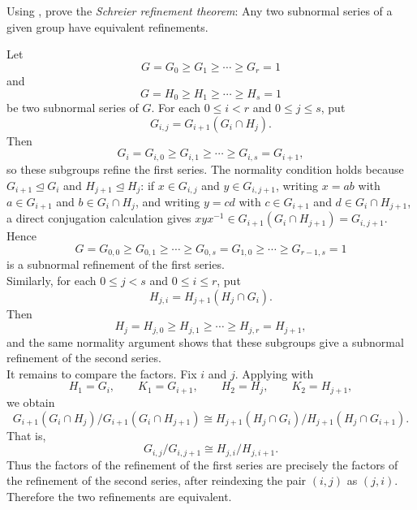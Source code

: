\documentclass[../Odyssey_Project.tex]{subfiles}
\begin{document}
\begin{exercise}
\label{ex:10.3}
Using , prove the \emph{Schreier refinement theorem}: Any two subnormal series of a given group have equivalent refinements.
\end{exercise}
\begin{solution}
Let
\[
  G=G_0\geq G_1\geq\cdots\geq G_r=1
\]
and
\[
  G=H_0\geq H_1\geq\cdots\geq H_s=1
\]
be two subnormal series of $G$. For each $0\leq i<r$ and $0\leq j\leq s$, put
\[
  G_{i,j}=G_{i+1}(G_i\cap H_j).
\]
Then
\[
  G_i=G_{i,0}\geq G_{i,1}\geq\cdots\geq G_{i,s}=G_{i+1},
\]
so these subgroups refine the first series. The normality condition holds because $G_{i+1}\trianglelefteq G_i$ and $H_{j+1}\trianglelefteq H_j$: if $x\in G_{i,j}$ and $y\in G_{i,j+1}$, writing $x=ab$ with $a\in G_{i+1}$ and $b\in G_i\cap H_j$, and writing $y=cd$ with $c\in G_{i+1}$ and $d\in G_i\cap H_{j+1}$, a direct conjugation calculation gives $xyx^{-1}\in G_{i+1}(G_i\cap H_{j+1})=G_{i,j+1}$. Hence
\[
  G=G_{0,0}\geq G_{0,1}\geq\cdots\geq G_{0,s}
  =G_{1,0}\geq\cdots\geq G_{r-1,s}=1
\]
is a subnormal refinement of the first series.\\
Similarly, for each $0\leq j<s$ and $0\leq i\leq r$, put
\[
  H_{j,i}=H_{j+1}(H_j\cap G_i).
\]
Then
\[
  H_j=H_{j,0}\geq H_{j,1}\geq\cdots\geq H_{j,r}=H_{j+1},
\]
and the same normality argument shows that these subgroups give a subnormal refinement of the second series.\\
It remains to compare the factors. Fix $i$ and $j$. Applying  with
\[
  H_1=G_i,\qquad K_1=G_{i+1},\qquad H_2=H_j,\qquad K_2=H_{j+1},
\]
we obtain
\[
  G_{i+1}(G_i\cap H_j)/G_{i+1}(G_i\cap H_{j+1})
  \cong
  H_{j+1}(H_j\cap G_i)/H_{j+1}(H_j\cap G_{i+1}).
\]
That is,
\[
  G_{i,j}/G_{i,j+1}
  \cong
  H_{j,i}/H_{j,i+1}.
\]
Thus the factors of the refinement of the first series are precisely the factors of the refinement of the second series, after reindexing the pair $(i,j)$ as $(j,i)$. Therefore the two refinements are equivalent.
\end{solution}
\end{document}
